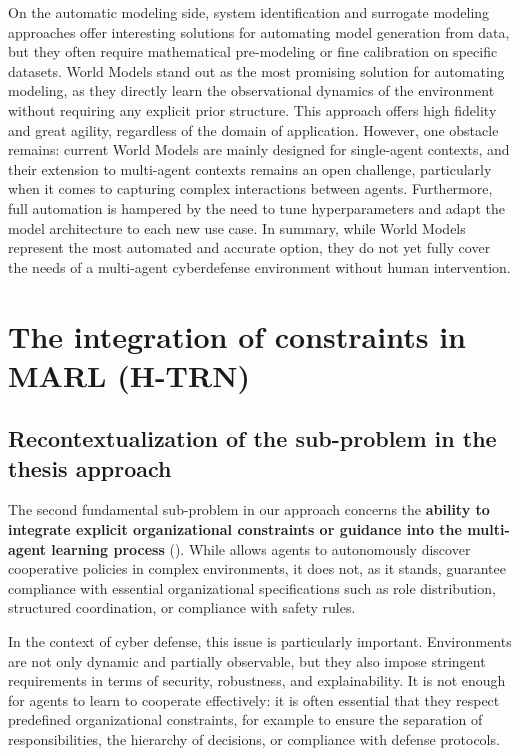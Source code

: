 On the automatic modeling side, system identification and surrogate modeling approaches offer interesting solutions for automating model generation from data, but they often require mathematical pre-modeling or fine calibration on specific datasets. World Models stand out as the most promising solution for automating modeling, as they directly learn the observational dynamics of the environment without requiring any explicit prior structure. This approach offers high fidelity and great agility, regardless of the domain of application. However, one obstacle remains: current World Models are mainly designed for single-agent contexts, and their extension to multi-agent contexts remains an open challenge, particularly when it comes to capturing complex interactions between agents. Furthermore, full automation is hampered by the need to tune hyperparameters and adapt the model architecture to each new use case. In summary, while World Models represent the most automated and accurate option, they do not yet fully cover the needs of a multi-agent cyberdefense environment without human intervention.

\section{The integration of constraints in MARL (H-TRN)}

\subsection*{Recontextualization of the sub-problem in the thesis approach}

The second fundamental sub-problem in our approach concerns the \textbf{ability to integrate explicit organizational constraints or guidance into the multi-agent learning process} (). While  allows agents to autonomously discover cooperative policies in complex environments, it does not, as it stands, guarantee compliance with essential organizational specifications such as role distribution, structured coordination, or compliance with safety rules.

In the context of cyber defense, this issue is particularly important. Environments are not only dynamic and partially observable, but they also impose stringent requirements in terms of security, robustness, and explainability. It is not enough for agents to learn to cooperate effectively: it is often essential that they respect predefined organizational constraints, for example to ensure the separation of responsibilities, the hierarchy of decisions, or compliance with defense protocols.

